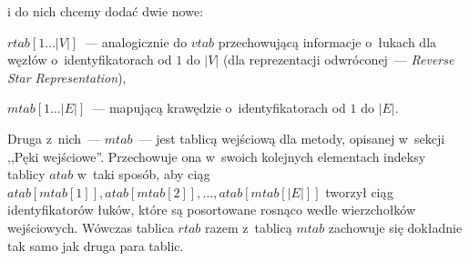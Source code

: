 i do nich chcemy dodać dwie nowe:

\begin{myitemize}
	\item $rtab \left[ 1 \ldots \left| V \right| \right] $~---  analogicznie do $vtab$ przechowującą informacje o~łukach dla węzłów o~identyfikatorach od $1$ do $ \left| V \right| $ (dla reprezentacji odwróconej~---  \textit{Reverse Star Representation}),
	\item $mtab \left[ 1 \ldots \left| E \right| \right] $~---  mapującą krawędzie o~identyfikatorach od $1$ do $ \left| E \right| $.
\end{myitemize}

Druga z~nich~---  $mtab$~---  jest tablicą wejściową dla metody, opisanej w~sekcji ,,Pęki wejściowe''. Przechowuje ona w~swoich kolejnych elementach indeksy tablicy $atab$ w~taki sposób, aby ciąg \\ $atab \left[ mtab \left[ 1 \right] \right], atab \left[ mtab \left[ 2 \right] \right], \ldots, atab \left[ mtab \left[ \left| E \right| \right] \right] $ tworzył ciąg identyfikatorów łuków, które są posortowane rosnąco wedle wierzchołków wejściowych. Wówczas tablica $rtab$ razem z~tablicą $mtab$ zachowuje się dokładnie tak samo jak druga para tablic.

